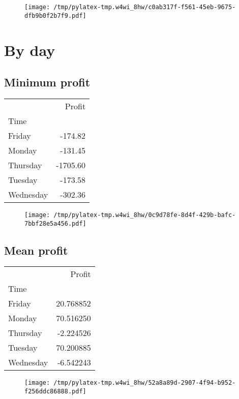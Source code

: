 \documentclass{article}%
\begin{document}
\begin{figure}[htbp]%
\centering%
\texttt{[image: /tmp/pylatex-tmp.w4wi\_8hw/c0ab317f-f561-45eb-9675-dfb9b0f2b7f9.pdf]}%
\end{figure}

%
\newpage %
\section{By day}%
\label{sec:Byday}%
\subsection{Minimum profit }%
\label{subsec:Minimumprofit}%
\begin{tabular}{lr}
\toprule
{} &   Profit \\
Time      &          \\
\midrule
Friday    &  -174.82 \\
Monday    &  -131.45 \\
Thursday  & -1705.60 \\
Tuesday   &  -173.58 \\
Wednesday &  -302.36 \\
\bottomrule
\end{tabular}
%


\begin{figure}[htbp]%
\centering%
\texttt{[image: /tmp/pylatex-tmp.w4wi\_8hw/0c9d78fe-8d4f-429b-bafc-7bbf28e5a456.pdf]}%
\end{figure}

%
\newpage %
\subsection{Mean profit }%
\label{subsec:Meanprofit}%
\begin{tabular}{lr}
\toprule
{} &     Profit \\
Time      &            \\
\midrule
Friday    &  20.768852 \\
Monday    &  70.516250 \\
Thursday  &  -2.224526 \\
Tuesday   &  70.200885 \\
Wednesday &  -6.542243 \\
\bottomrule
\end{tabular}
%


\begin{figure}[htbp]%
\centering%
\texttt{[image: /tmp/pylatex-tmp.w4wi\_8hw/52a8a89d-2907-4f94-b952-f256ddc86888.pdf]}%
\end{figure}
\end{document}
